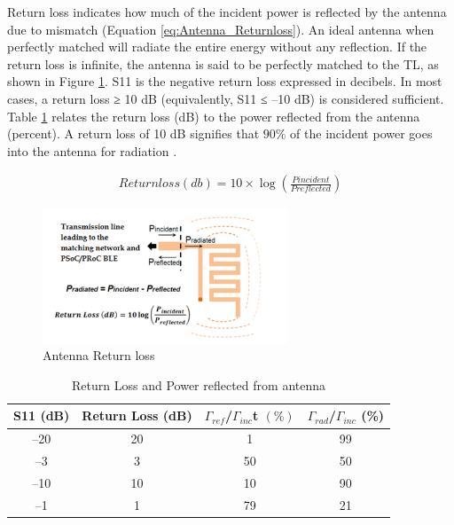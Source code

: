 \indent  Return loss indicates how much of the incident power is reflected by the antenna due to mismatch (Equation \ref{eq:Antenna_Returnloss}).
An ideal antenna when perfectly matched will radiate the entire energy without any reflection. If the return loss is infinite, the antenna is said to be perfectly matched to the TL, as shown in Figure \ref{fig:ANTENNA_RETUNRNLOSS}. S11 is the negative return loss expressed in decibels. In most cases, a return loss ≥ 10 dB (equivalently, S11 ≤ –10 dB) is considered sufficient. Table \ref{tb:ANTENNA_RETURNlOSS_TABLE} relates the return loss (dB) to the power reflected from the antenna (percent). 
A return loss of 10 dB signifies that $90\%$ of the incident power goes into the antenna for radiation \cite{AN91445}.

\begin{equation}\label{eq:Antenna_Returnloss}
    \begin{split}
        Returnloss(db) = 10 \times \log( \frac{Pincident}{Preflected})
    \end{split}
\end{equation}

\begin{figure}[h]
	\centering
	\includegraphics[width=0.65\textwidth]{Chap03/Figures/Antenna_ReturnLoss.PNG}
	\caption{Antenna Return loss}
	\label{fig:ANTENNA_RETUNRNLOSS}
\end{figure}

\begin{table}[h]
	\begin{tabular}{|c|c|c|c| }
		\hline 
		S11 (dB) & Return Loss (dB) & $\varGamma_{ref}$/$\varGamma_{inc}$t $(\%)$ & $\varGamma_{rad}$/$\varGamma_{inc}$ (\%) \\ 
		\hline
		–20 &20 &1 &99\\
		\hline
		–3 &3 &50 &50\\
		\hline
		–10 &10 &10& 90\\
		\hline
		–1 &1 &79 &21\\
		\hline
	\end{tabular}
	\caption{Return Loss and Power reflected from antenna}
	\label{tb:ANTENNA_RETURNlOSS_TABLE}
\end{table}



